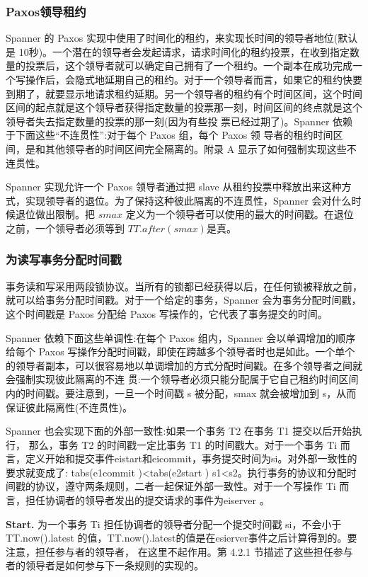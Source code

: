 \documentclass[letterpaper,twocolumn,10pt]{article}
\begin{document}
\subsubsection{Paxos领导租约}
Spanner 的 Paxos 实现中使用了时间化的租约，来实现长时间的领导者地位(默认是 10秒)。一个潜在的领导者会发起请求，请求时间化的租约投票，在收到指定数量的投票后，这个领导者就可以确定自己拥有了一个租约。一个副本在成功完成一个写操作后，会隐式地延期自己的租约。对于一个领导者而言，如果它的租约快要到期了，就要显示地请求租约延期。另一个领导者的租约有个时间区间，这个时间区间的起点就是这个领导者获得指定数量的投票那一刻，时间区间的终点就是这个领导者失去指定数量的投票的那一刻(因为有些投 票已经过期了)。Spanner 依赖于下面这些“不连贯性”:对于每个 Paxos 组，每个 Paxos 领 导者的租约时间区间，是和其他领导者的时间区间完全隔离的。附录 A 显示了如何强制实现这些不连贯性。

Spanner 实现允许一个 Paxos 领导者通过把 slave 从租约投票中释放出来这种方式，实现领导者的退位。为了保持这种彼此隔离的不连贯性，Spanner 会对什么时候退位做出限制。把 $smax$ 定义为一个领导者可以使用的最大的时间戳。在退位之前，一个领导者必须等到 $TT.after(smax)$是真。

\subsubsection{为读写事务分配时间戳}
事务读和写采用两段锁协议。当所有的锁都已经获得以后，在任何锁被释放之前，就可以给事务分配时间戳。对于一个给定的事务，Spanner 会为事务分配时间戳，这个时间戳是 Paxos 分配给 Paxos 写操作的，它代表了事务提交的时间。

Spanner 依赖下面这些单调性:在每个 Paxos 组内，Spanner 会以单调增加的顺序给每个 Paxos 写操作分配时间戳，即使在跨越多个领导者时也是如此。一个单个的领导者副本，可以很容易地以单调增加的方式分配时间戳。在多个领导者之间就会强制实现彼此隔离的不连 贯:一个领导者必须只能分配属于它自己租约时间区间内的时间戳。要注意到，一旦一个时间戳 s 被分配，smax 就会被增加到 s，从而保证彼此隔离性(不连贯性)。

Spanner 也会实现下面的外部一致性:如果一个事务 T2 在事务 T1 提交以后开始执行， 那么，事务 T2 的时间戳一定比事务 T1 的时间戳大。对于一个事务 Ti 而言，定义开始和提交事件eistart和eicommit，事务提交时间为si。对外部一致性的要求就变成了:
tabs(e1commit )<tabs(e2start ) s1<s2。执行事务的协议和分配时间戳的协议，遵守两条规则，二者一起保证外部一致性。对于一个写操作 Ti 而言，担任协调者的领导者发出的提交请求的事件为eiserver 。

\textbf{Start.} 为一个事务 Ti 担任协调者的领导者分配一个提交时间戳 si，不会小于 TT.now().latest 的值，TT.now().latest的值是在esierver事件之后计算得到的。要注意，担任参与者的领导者， 在这里不起作用。第 4.2.1 节描述了这些担任参与者的领导者是如何参与下一条规则的实现的。
\end{document}
